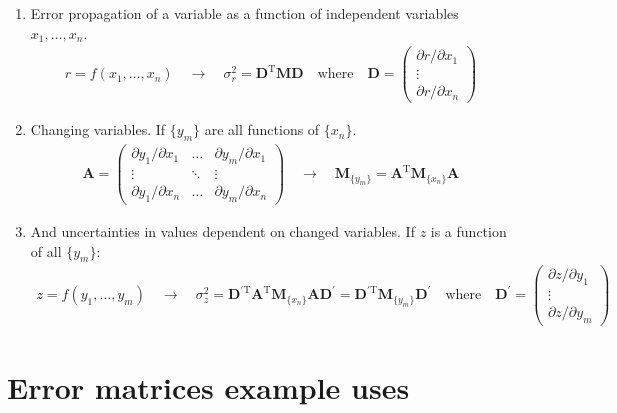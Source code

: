 \documentclass{article}
\renewcommand{\vec}[1]{\boldsymbol{\mathbf{#1}}}
\begin{document}
\begin{enumerate}
\item Error propagation of a variable as a function of independent variables $x_1,\dotsc,x_n$.
  \begin{align}
    r = f(x_1,\dotsc,x_n) \quad\rightarrow\quad \sigma_r^2 = \vec{D}^{\mathrm{T}}\vec{M}\vec{D} \quad \text{where}\quad \vec{D} =
    \begin{pmatrix}
      \partial r / \partial x_1 \\
      \vdots \\
      \partial r / \partial x_n
    \end{pmatrix}
    \label{eq:pt1}
  \end{align}
\item Changing variables. If $\{y_m\}$ are all functions of $\{x_n\}$.
  \begin{align}
    \vec{A} = \begin{pmatrix}
      \partial y_1/\partial x_1 & \ldots & \partial y_m/\partial x_1 \\
      \vdots                    & \ddots & \vdots                    \\
      \partial y_1/\partial x_n & \ldots & \partial y_m/\partial x_n
    \end{pmatrix} \quad\rightarrow\quad
    \vec{M}_{\{y_m\}} = \vec{A}^{\mathrm{T}}\vec{M}_{\{x_n\}}\vec{A}
    \label{eq:pt2}
  \end{align}
\item And uncertainties in values dependent on changed variables. If $z$ is a function of all $\{y_m\}$:
  \begin{align}
    z=f(y_1,\dotsc,y_m) \quad\rightarrow\quad \sigma_z^2 = \vec{D}^{\prime\mathrm{T}} \vec{A}^{\mathrm{T}}\vec{M}_{\{x_n\}}\vec{A}\vec{D}^{\prime} = \vec{D}^{\prime\mathrm{T}}\vec{M}_{\{y_m\}}\vec{D}^{\prime} \quad\text{where}\quad \vec{D}^{\prime} = \begin{pmatrix}
      \partial z/\partial y_1 \\
      \vdots                  \\
      \partial z/\partial y_m
    \end{pmatrix}
    \label{eq:pt3}
  \end{align}
\end{enumerate}
\section{Error matrices example uses}
\end{document}
